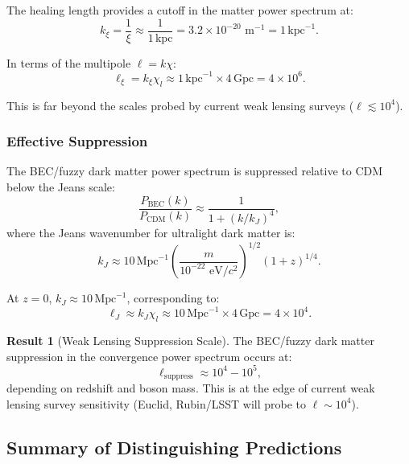 \documentclass[11pt,a4paper]{article}
\newcommand{\kpc}{\ensuremath{\mathrm{kpc}}}
\newcommand{\Mpc}{\ensuremath{\mathrm{Mpc}}}
\theoremstyle{definition}
\newtheorem{result}{Result}[section]
\theoremstyle{remark}
\begin{document}
The healing length provides a cutoff in the matter power spectrum at:
\begin{equation}
k_\xi = \frac{1}{\xi} \approx \frac{1}{1 \, \kpc} = 3.2 \times 10^{-20} \text{ m}^{-1} = 1 \, \kpc^{-1}.
\end{equation}

In terms of the multipole $\ell = k \chi$:
\begin{equation}
\ell_\xi = k_\xi \chi_l \approx 1 \, \kpc^{-1} \times 4 \, \text{Gpc} = 4 \times 10^6.
\end{equation}

This is far beyond the scales probed by current weak lensing surveys ($\ell \lesssim 10^4$).

\subsubsection{Effective Suppression}

The BEC/fuzzy dark matter power spectrum is suppressed relative to CDM below the Jeans scale:
\begin{equation}
\frac{P_{\mathrm{BEC}}(k)}{P_{\mathrm{CDM}}(k)} \approx \frac{1}{1 + (k/k_J)^4},
\end{equation}
where the Jeans wavenumber for ultralight dark matter is:
\begin{equation}
k_J \approx 10 \, \Mpc^{-1} \left(\frac{m}{10^{-22} \text{ eV}/c^2}\right)^{1/2} (1+z)^{1/4}.
\end{equation}

At $z = 0$, $k_J \approx 10 \, \Mpc^{-1}$, corresponding to:
\begin{equation}
\ell_J \approx k_J \chi_l \approx 10 \, \Mpc^{-1} \times 4 \, \text{Gpc} = 4 \times 10^4.
\end{equation}

\begin{result}[Weak Lensing Suppression Scale]
The BEC/fuzzy dark matter suppression in the convergence power spectrum occurs at:
\begin{equation}
\boxed{\ell_{\mathrm{suppress}} \approx 10^4 - 10^5,}
\end{equation}
depending on redshift and boson mass. This is at the edge of current weak lensing survey sensitivity (Euclid, Rubin/LSST will probe to $\ell \sim 10^4$).
\end{result}

\subsection{Summary of Distinguishing Predictions}
\label{sec:predictions_summary}
\end{document}
